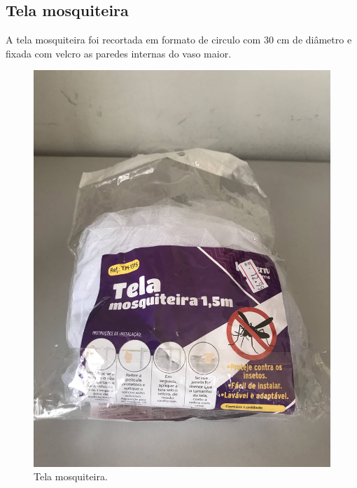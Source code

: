 \documentclass[
	12pt,				%
	openright,			%
	oneside,			%
	a4paper,			%
	chapter=TITLE,		%
	english,			%
	brazil				%
	]{abntex2}
\begin{document}
\subsection{Tela mosquiteira}

A tela mosquiteira foi recortada em formato de circulo com 30 cm de diâmetro e fixada com velcro as paredes internas do vaso maior.

\begin{multicols}{2}
\begin{figure}[H]
    \centering
    \includegraphics[scale=0.04, angle=-90]{imagens/IMG_0602.jpg}
    \caption{Tela mosquiteira.}
    \label{fig:mosquiteira}
\end{figure}   
\begin{figure}[H]
    \centering

\end{figure}
\end{multicols}
\end{document}
